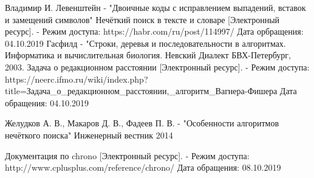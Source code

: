 \newpage
{}

\begin{thebibliography}{}
     Владимир И. Левенштейн - "Двоичные коды с исправлением выпадений, вставок и замещений символов"
     Нечёткий поиск в тексте и словаре [Электронный ресурс]. - Режим доступа: https://habr.com/ru/post/114997/ Дата орбращения: 04.10.2019
     Гасфилд - "Строки, деревья и последовательности в алгоритмах. Информатика и вычислительная биология. Невский Диалект БВХ-Петербург, 2003.
     Задача о редакционном расстоянии [Электронный ресурс]. - Режим доступа: https://neerc.ifmo.ru/wiki/index.php?title=Задача\_о\_редакционном\_расстоянии,\_алгоритм\_Вагнера-Фишера Дата обращения: 04.10.2019

     Желудков А. В., Макаров Д. В., Фадеев П. В. - "Особенности алгоритмов нечёткого поиска" Инженерный вестник 2014

     Документация по chrono [Электронный ресурс]. -  Режим доступа: http://www.cplusplus.com/reference/chrono/ Дата обращения: 08.10.2019
\end{thebibliography}
